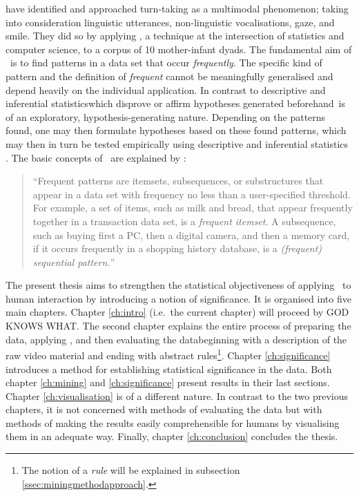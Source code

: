 \citet{rohlfing_multimodal_underreview} have identified and approached turn-taking as a multimodal phenomenon; taking into consideration linguistic utterances, non-linguistic vocalisations, gaze, and smile.
They did so by applying \fpmlower, a technique at the intersection of statistics and computer science, to a corpus of 10 mother-infant dyads.
The fundamental aim of \fpmlower\ is to find patterns in a data set that occur \emph{frequently}.
The specific kind of pattern and the definition of \emph{frequent} cannot be meaningfully generalised and depend heavily on the individual application.
In contrast to descriptive and inferential statistics\dash which disprove or affirm hypotheses generated beforehand\dash \fpmlower\ is of an exploratory, hypothesis-generating nature.
Depending on the patterns found, one may then formulate hypotheses based on these found patterns, which may then in turn be tested empirically using descriptive and inferential statistics \cite[]{rohlfing_multimodal_underreview,han_data_2012}. %
The basic concepts of \fpmlower\ are explained by \citet[, emphasis in original]{han_frequent_2007}:
\begin{quote}
``Frequent patterns are itemsets, subsequences, or substructures that appear in a data set with frequency no less than a user-specified threshold.
For example, a set of items, such as milk and bread, that appear frequently together in a transaction data set, is a \emph{frequent itemset}.
A subsequence, such as buying first a PC, then a digital camera, and then a memory card, if it occurs frequently in a shopping history database, is a \emph{(frequent) sequential pattern.}''
\end{quote}

The present thesis aims to strengthen the statistical objectiveness of applying \fpmlower\ to human interaction by introducing a notion of significance.
It is organised into five main chapters.
Chapter \ref{ch:intro} (i.e.\ the current chapter) will proceed by GOD KNOWS WHAT.
The second chapter explains the entire process of preparing the data, applying \fpmlower, and then evaluating the data\dash beginning with a description of the raw video material and ending with abstract rules\footnote{The notion of a \emph{rule} will be explained in subsection \ref{ssec:miningmethodapproach}.}.
Chapter \ref{ch:significance} introduces a method for establishing statistical significance in the data.
Both chapter \ref{ch:mining} and \ref{ch:significance} present results in their last sections.
Chapter \ref{ch:visualisation} is of a different nature.
In contrast to the two previous chapters, it is not concerned with methods of evaluating the data but with methods of making the results easily comprehensible for humans by visualising them in an adequate way.
Finally, chapter \ref{ch:conclusion} concludes the thesis.




